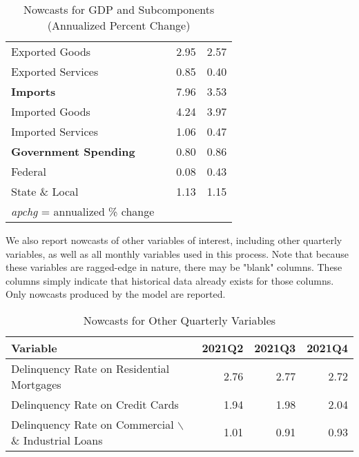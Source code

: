 \documentclass[11pt, letterpaper]{article}\usepackage[]{graphicx}\usepackage[]{color}
\begin{document}
\begin{table}[H]
\begin{tabular}{lrrr}
  \hspace{8mm}  Exported Goods &  & 2.95 & 2.57 \\ 
  \hspace{8mm}  Exported Services &  & 0.85 & 0.40 \\ 
  \hspace{0mm} \textbf{Imports} &  & 7.96 & 3.53 \\ 
  \hspace{8mm}  Imported Goods &  & 4.24 & 3.97 \\ 
  \hspace{8mm}  Imported Services &  & 1.06 & 0.47 \\ 
  \hspace{0mm} \textbf{Government Spending} &  & 0.80 & 0.86 \\ 
  \hspace{8mm}  Federal &  & 0.08 & 0.43 \\ 
  \hspace{8mm}  State \& Local &  & 1.13 & 1.15 \\ 
   \hline 
 \textit{apchg} = annualized \% change 
\end{tabular}
\endgroup
\caption{Nowcasts for GDP and Subcomponents (Annualized Percent Change)} 
\end{table}


We also report nowcasts of other variables of interest, including other quarterly variables, as well as all monthly variables used in this process. Note that because these variables are ragged-edge in nature, there may be "blank" columns. These columns simply indicate that historical data already exists for those columns. Only nowcasts produced by the model are reported.
\begin{table}[H]
\centering
\begingroup\fontsize{11pt}{13pt}\selectfont
\begin{tabular}{lrrr}
  \hline
Variable & 2021Q2 & 2021Q3 & 2021Q4 \\ 
  \hline
Delinquency Rate on Residential Mortgages & 2.76 & 2.77 & 2.72 \\ 
  Delinquency Rate on Credit Cards & 1.94 & 1.98 & 2.04 \\ 
  Delinquency Rate on Commercial $\backslash$\& Industrial Loans & 1.01 & 0.91 & 0.93 \\ 
   \hline
\end{tabular}
\endgroup
\caption{Nowcasts for Other Quarterly Variables} 
\end{table}
\end{document}
